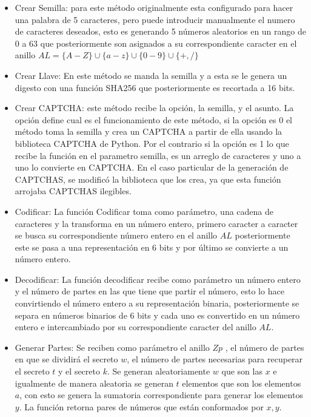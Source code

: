\begin{itemize}
 \item Crear Semilla: para este método originalmente esta configurado para hacer una palabra de 5 caracteres, pero puede introducir manualmente el numero de caracteres deseados, esto es generando 5 números aleatorios en un rango de 0 a 63 que posteriormente son asignados a su correspondiente caracter en el anillo $AL=\{A-Z\}\cup \{a-z\}\cup \{0-9\}\cup \{+,/\}$ 

 \item Crear Llave: En este método se manda la semilla y a esta se le genera un digesto con una función SHA256 	que posteriormente es recortada a 16 bits.

 \item Crear CAPTCHA: este método recibe la opción, la semilla, y el asunto. La opción define cual es el funcionamiento de este método, si la opción es 0 el método toma la semilla y crea un CAPTCHA a partir de ella usando la biblioteca CAPTCHA de Python. Por el contrario si la opción es 1 lo que recibe la función en el parametro semilla, es un arreglo de caracteres y uno a uno lo convierte en CAPTCHA.
En el caso particular de la generación de CAPTCHAS, se modificó la biblioteca que los crea, ya que esta función arrojaba CAPTCHAS ilegibles.

\item Codificar: La función Codificar toma como parámetro, una cadena de caracteres y la transforma en un número entero, primero caracter a caracter se busca su correspondiente número entero en el anillo $AL$ posteriormente este se pasa a una representación en 6 bits y por último se convierte a un número entero.

\item Decodificar: La función decodificar recibe como parámetro un número entero y el número de partes en las que tiene que partir el número, esto lo hace convirtiendo el número entero a su representación binaria, posteriormente se separa en números binarios de 6 bits y cada uno es convertido en un número entero e intercambiado por su correspondiente caracter del anillo $AL$.

\item Generar Partes: Se reciben como parámetro el anillo $Zp$ , el número de partes en que se dividirá el secreto $w$, el número de partes necesarias para recuperar el secreto $t$ y el secreto $k$. Se generan aleatoriamente $w$ que son las $x$ e igualmente de manera aleatoria se generan $t$ elementos que son los elementos $a$, con esto se genera la sumatoria correspondiente para generar los elementos $y$. La función retorna pares de números que están conformados por $x,y$.


\end{itemize}
